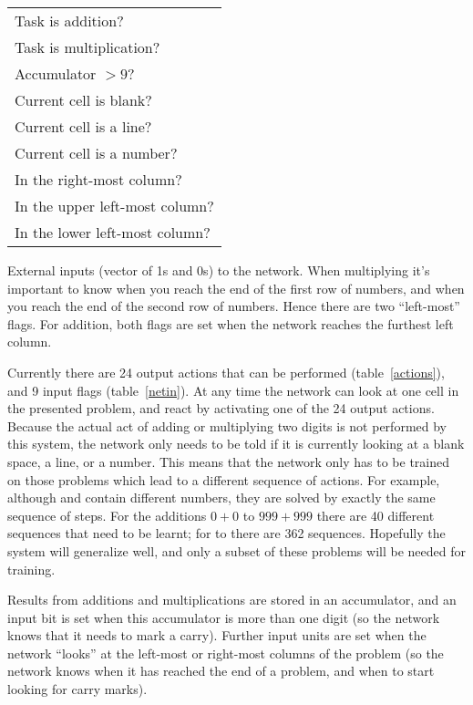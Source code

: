 \begin{fancytable}
\begin{center}
\begin{tabular}{l}
Task is addition?\\
Task is multiplication?\medskip\\
Accumulator $> 9$?\medskip\\
Current cell is blank?\\
Current cell is a line?\\
Current cell is a number?\medskip\\
In the right-most column?\\
In the upper left-most column?\\
In the lower left-most column?\\
\end{tabular}
\caption{External inputs (vector of 1s and 0s) to the
network.  When multiplying it's important to know when you reach the end of
the first row of numbers, and when you reach the end of the second row of
numbers.  Hence there are two ``left-most'' flags.  For addition, both
flags are set when the network reaches the furthest left column.}
\label{netin}
\end{center}
\end{fancytable}

Currently there are 24 output actions that can be performed
(table~\ref{actions}), and 9 input flags (table~\ref{netin}).
At any time the network can look at one cell in the presented problem, and
react by activating one of the 24 output actions.  Because the actual act
of adding or multiplying two digits is not performed by this system, the
network only needs to be told if it is currently looking at a blank space,
a line, or a number.  This means that the network only has to be trained on
those problems which lead to a different sequence of actions.  For example,
although  and  contain different numbers, they are solved by
exactly the same sequence of steps.  For the additions $0+0$ to $999+999$
there are 40 different sequences that need to be learnt; for  to
 there are 362 sequences.  Hopefully the system will generalize
well, and only a subset of these problems will be needed for training.

Results from additions and multiplications are stored in an accumulator,
and an input bit is set when this accumulator is more than one digit (so
the network knows that it needs to mark a carry). Further input units are
set when the network ``looks'' at the left-most or right-most columns of
the problem (so the network knows when it has reached the end of a problem,
and when to start looking for carry marks).


